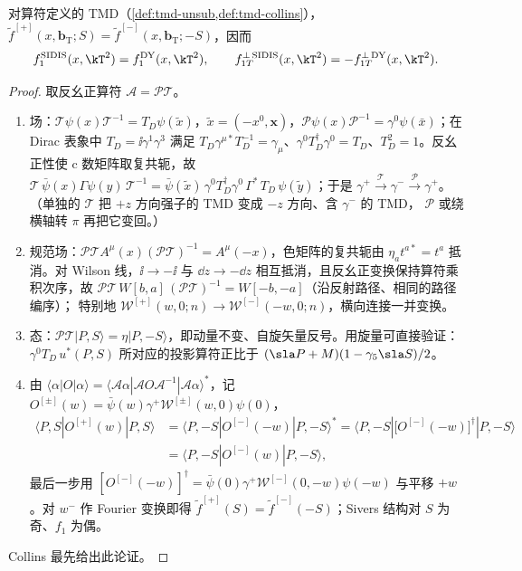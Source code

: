 \begin{theorem}\tagR
\label{thm:sivers-sign}
对算符定义的 TMD（\cref{def:tmd-unsub,def:tmd-collins}），$\tilde f^{[+]}(x,\boldsymbol b_{\mathrm T};S)=\tilde f^{[-]}(x,\boldsymbol b_{\mathrm T};-S)$，因而
\begin{equation}
  f_1^{\mathrm{SIDIS}}(x,\kT^2)=f_1^{\mathrm{DY}}(x,\kT^2),\qquad f_{1T}^{\perp\,\mathrm{SIDIS}}(x,\kT^2)=-f_{1T}^{\perp\,\mathrm{DY}}(x,\kT^2).
  \label{eq:sivers-sign}
\end{equation}
\end{theorem}
\begin{proof}
取反幺正算符 $\mathcal A=\mathcal{PT}$。
\begin{enumerate}[label=(\roman*),leftmargin=2.2em]
\item 场：$\mathcal T\psi(x)\mathcal T^{-1}=T_D\psi(\tilde x)$，$\tilde x=(-x^0,\boldsymbol x)$，$\mathcal P\psi(x)\mathcal P^{-1}=\gamma^0\psi(\bar x)$；在 Dirac 表象中
$T_D=\ii\gamma^1\gamma^3$ 满足 $T_D\gamma^{\mu*}T_D^{-1}=\gamma_\mu$、$\gamma^0T_D^\dagger\gamma^0=T_D$、$T_D^2=1$。反幺正性使 c 数矩阵取复共轭，故
$\mathcal T\,\bar\psi(x)\Gamma\psi(y)\,\mathcal T^{-1}=\bar\psi(\tilde x)\,\gamma^0T_D^\dagger\gamma^0\,\Gamma^*\,T_D\,\psi(\tilde y)$；于是
$\gamma^+\xrightarrow{\ \mathcal T\ }\gamma^-\xrightarrow{\ \mathcal P\ }\gamma^+$。（单独的 $\mathcal T$ 把 $+z$ 方向强子的 TMD 变成 $-z$ 方向、含 $\gamma^-$ 的 TMD，
$\mathcal P$ 或绕横轴转 $\pi$ 再把它变回。）
\item 规范场：$\mathcal{PT}A^\mu(x)(\mathcal{PT})^{-1}=A^\mu(-x)$，色矩阵的复共轭由 $\eta_at^{a*}=t^a$ 抵消。对 Wilson 线，$\ii\to-\ii$ 与
$\dd z\to-\dd z$ 相互抵消，且反幺正变换保持算符乘积次序，故 $\mathcal{PT}\,W[b,a]\,(\mathcal{PT})^{-1}=W[-b,-a]$（沿反射路径、相同的路径编序）；
特别地 $\mathcal W^{[+]}(w,0;n)\to\mathcal W^{[-]}(-w,0;n)$，横向连接一并变换。
\item 态：$\mathcal{PT}|P,S\rangle=\eta|P,-S\rangle$，即动量不变、自旋矢量反号。用旋量可直接验证：
$\gamma^0T_D\,u^*(P,S)$ 所对应的投影算符正比于 $(\sla P+M)(1-\gamma_5\sla S)/2$。
\item 由 $\langle\alpha|O|\alpha\rangle=\langle\mathcal A\alpha|\mathcal AO\mathcal A^{-1}|\mathcal A\alpha\rangle^*$，记 $O^{[\pm]}(w)=\bar\psi(w)\gamma^+\mathcal W^{[\pm]}(w,0)\psi(0)$，
\[
  \begin{aligned}
  \langle P,S|O^{[+]}(w)|P,S\rangle&=\langle P,-S|O^{[-]}(-w)|P,-S\rangle^*=\langle P,-S|\big[O^{[-]}(-w)\big]^\dagger|P,-S\rangle\\
  &=\langle P,-S|O^{[-]}(w)|P,-S\rangle ,
  \end{aligned}
\]
最后一步用 $[O^{[-]}(-w)]^\dagger=\bar\psi(0)\gamma^+\mathcal W^{[-]}(0,-w)\psi(-w)$ 与平移 $+w$。对 $w^-$ 作 Fourier 变换即得
$\tilde f^{[+]}(S)=\tilde f^{[-]}(-S)$；Sivers 结构对 $S$ 为奇、$f_1$ 为偶。
\end{enumerate}
Collins\cite{Collins2002} 最先给出此论证。
\end{proof}

